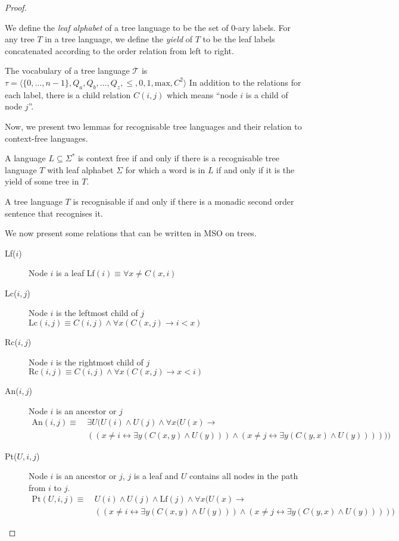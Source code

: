 \begin{proof}
\begin{define}
        We define the \emph{leaf alphabet} of a tree language to be the set of $0$-ary labels.
        For any tree $T$ in a tree language, we define the \emph{yield} of $T$ to be the leaf labels concatenated according to the order relation from left to right.

        The vocabulary of a tree language $\mathcal{T}$ is $\tau = \langle \{0, \dots, n - 1\}, Q_a, Q_b, \dots, Q_z, \leq , 0, 1, \text{max} , C^2 \rangle$
        In addition to the relations for each label, there is a child relation $C(i, j)$ which means ``node $i$ is a child of node $j$''.
    \end{define}

    Now, we present two lemmas for recognisable tree languages and their relation to context-free languages.
    \begin{lemma}
        A language $L \subseteq \Sigma^{*}$ is context free if and only if there is a recognisable tree language $T$ with leaf alphabet $\Sigma$ for which a word is in $L$ if and only if it is the yield of some tree in $T$.
    \end{lemma}

    \begin{lemma}
        A tree language $T$ is recognisable if and only if there is a monadic second order sentence that recognises it.
    \end{lemma}

    We now present some relations that can be written in MSO on trees.
    \begin{description}
        \item[Lf($i$)] Node $i$ is a leaf $\text{Lf}(i) \equiv \forall x \neq C(x, i)$
        \item[Lc($i, j$)] Node $i$ is the leftmost child of $j$ $\text{Lc}(i, j) \equiv C(i, j) \land \forall x (C(x, j) \to i < x)$
        \item[Rc($i, j$)] Node $i$ is the rightmost child of $j$ $\text{Rc}(i, j) \equiv C(i, j) \land \forall x (C(x, j) \to x < i)$
        \item[An($i, j$)] Node $i$ is an ancestor or $j$
        \begin{align*}
            \text{An}(i, j) \equiv~&\exists U (U(i) \land U(j) \land \forall x (U(x) \to \\
            &((x \neq i \leftrightarrow \exists y (C(x, y) \land U(y))) \land (x \neq j \leftrightarrow \exists y (C(y, x) \land U(y))))))
        \end{align*}
        \item[Pt($U, i, j$)] Node $i$ is an ancestor or $j$, $j$ is a leaf and $U$ contains all nodes in the path from $i$ to $j$.
        \begin{align*}
            \text{Pt}(U, i, j) \equiv~&U(i) \land U(j) \land \text{Lf}(j) \land \forall x (U(x) \to \\
            &((x \neq i \leftrightarrow \exists y (C(x, y) \land U(y))) \land (x \neq j \leftrightarrow \exists y (C(y, x) \land U(y)))))
        \end{align*}
    \end{description}


\end{proof}
